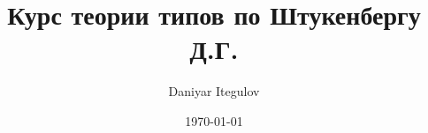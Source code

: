 \documentclass[fleqn,12pt]{article}
\author{Daniyar Itegulov}
\date{\today}
\title{Курс теории типов по Штукенбергу Д.Г.}
\newcommand{\+}{\lambda}
\begin{document}
\theoremstyle{definition}
\newtheorem*{definition}{Определение}
\newtheorem*{example}{Пример}
\newtheorem{theorem}{Теорема}[section]
\newtheorem{axiom}{Аксиома}[section]
\newtheorem{lemma}[theorem]{Лемма}

\maketitle
\tableofcontents


\end{document}
